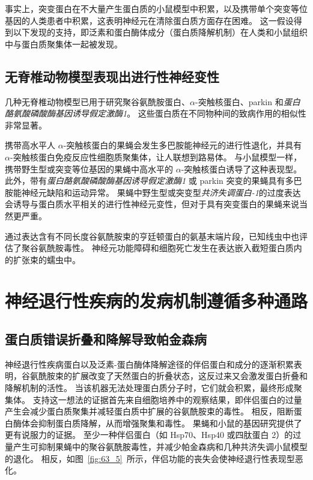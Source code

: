 事实上，突变蛋白在不大量产生蛋白质的小鼠模型中积累，以及携带单个突变等位基因的人类患者中积累，这表明神经元在清除蛋白质方面存在困难。
这一假设得到以下发现的支持，即泛素和蛋白酶体成分（蛋白质降解机制）在人类和小鼠组织中与蛋白质聚集体一起被发现。



\subsection{无脊椎动物模型表现出进行性神经变性}

几种无脊椎动物模型已用于研究聚谷氨酰胺蛋白、$\alpha$-突触核蛋白、parkin 和\textit{蛋白酪氨酸磷酸酶基因诱导假定激酶1}。
这些蛋白质在不同物种间的致病作用的相似性非常显著。


携带高水平人 $\alpha$-突触核蛋白的果蝇会发生多巴胺能神经元的进行性退化，并具有 $\alpha$-突触核蛋白免疫反应性细胞质聚集体，让人联想到路易体。
与小鼠模型一样，携带野生型或突变等位基因的果蝇中高水平的 $\alpha$-突触核蛋白诱导了这种表现型。
此外，带有\textit{蛋白酪氨酸磷酸酶基因诱导假定激酶1} 或 parkin 突变的果蝇具有多巴胺能神经元缺陷和运动异常。
果蝇中野生型或突变型\textit{共济失调蛋白-1}的过度表达会诱导与蛋白质水平相关的进行性神经元变性，但对于具有突变蛋白的果蝇来说当然更严重。


通过表达含有不同长度谷氨酰胺束的亨廷顿蛋白的氨基末端片段，已知线虫中也评估了聚谷氨酰胺毒性。
神经元功能障碍和细胞死亡发生在表达嵌入截短蛋白质内的扩张束的蠕虫中。



\section{神经退行性疾病的发病机制遵循多种通路}

\subsection{蛋白质错误折叠和降解导致帕金森病}

神经退行性疾病蛋白以及泛素-蛋白酶体降解途径的伴侣蛋白和成分的逐渐积累表明，谷氨酰胺束的扩展改变了天然蛋白的折叠状态，这反过来又会激发蛋白折叠和降解机制的活性。
当该机器无法处理蛋白质分子时，它们就会积累，最终形成聚集体。
支持这一想法的证据首先来自细胞培养中的观察结果，即伴侣蛋白的过量产生会减少蛋白质聚集并减轻蛋白质中扩展的谷氨酰胺束的毒性。
相反，阻断蛋白酶体会抑制蛋白质降解，从而增强聚集和毒性。
果蝇和小鼠的基因研究提供了更有说服力的证据。
至少一种伴侣蛋白（如 Hsp70、Hsp40 或四肽蛋白 2）的过量产生可抑制果蝇中的聚谷氨酰胺毒性，并减少帕金森病和几种共济失调小鼠模型的退化。
相反，如图~\ref{fig:63_5}~所示，伴侣功能的丧失会使神经退行性表现型恶化。


